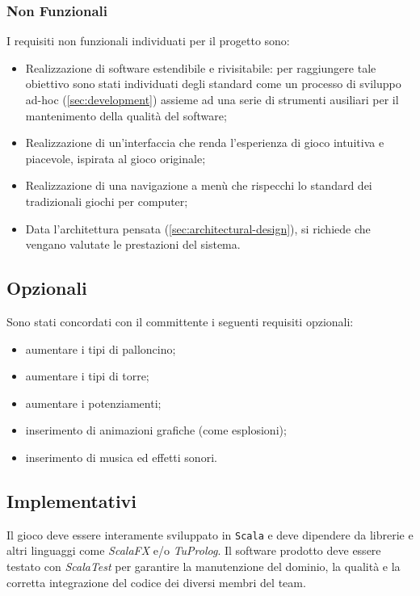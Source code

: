 \subsubsection{Non Funzionali}
I requisiti non funzionali individuati per il progetto sono:
\begin{itemize}
    \item Realizzazione di software estendibile e rivisitabile: per raggiungere tale obiettivo sono stati individuati
    degli standard come un processo di sviluppo ad-hoc (\ref{sec:development}) assieme ad una serie di strumenti
    ausiliari per il mantenimento della qualità del software;
    \item Realizzazione di un'interfaccia che renda l'esperienza di gioco intuitiva e piacevole, ispirata al gioco
    originale;
    \item Realizzazione di una navigazione a menù che rispecchi lo standard dei tradizionali giochi per computer;
    \item Data l'architettura pensata (\ref{sec:architectural-design}), si richiede che vengano valutate le prestazioni
    del sistema.
\end{itemize}

\subsection{Opzionali}
Sono stati concordati con il committente i seguenti requisiti opzionali:
\begin{itemize}
    \item aumentare i tipi di palloncino;
    \item aumentare i tipi di torre;
    \item aumentare i potenziamenti;
    \item inserimento di animazioni grafiche (come esplosioni);
    \item inserimento di musica ed effetti sonori.
\end{itemize}

\subsection{Implementativi}
Il gioco deve essere interamente sviluppato in \texttt{Scala} e deve dipendere da librerie e altri linguaggi come
\textit{ScalaFX} e/o \textit{TuProlog}. Il software prodotto deve essere testato con \textit{ScalaTest} per garantire la
manutenzione del dominio, la qualità e la corretta integrazione del codice dei diversi membri del team.